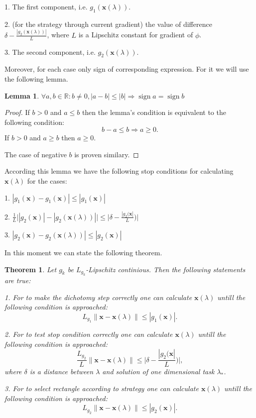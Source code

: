 \documentclass[12pt]{article}
\newtheorem{theorem}{Theorem}[section]
\newtheorem{lemma}{Lemma}[section]
\DeclareMathOperator{\sign}{sign}
\begin{document}
1. The first component, i.e. $g_1(\textbf{x}(\lambda))$.

2. (for the strategy through current gradient) the value of difference $\delta-\frac{|g_2(\textbf{x}(\lambda))|}{L}$, where $L$ is a Lipschitz constant for gradient of $\phi$.

3. The second component, i.e. $g_2(\textbf{x}(\lambda))$.

Moreover, for each case only sign of corresponding expression. For it we will use the following lemma.
\begin{lemma}
$\forall a,b\in\mathbb{R}:b\neq 0, |a-b|\leq |b| \Rightarrow \sign a = \sign b$
\end{lemma}
\begin{proof}
If $b>0$ and $a\leq b$ then the lemma's condition is equivalent to the following condition:
$$b-a\leq b\Rightarrow a\geq 0.$$
If $b>0$ and $a \geq b$ then $a\geq 0$.

The case of negative $b$ is proven similary.
\end{proof}

According this lemma we have the following stop conditions for calculating $\textbf{x}(\lambda)$ for the cases:

1. $|g_1(\textbf{x})-g_1(\textbf{x})|\leq |g_1(\textbf{x})|$

2. $\frac{1}{L}\Big||g_2(\textbf{x})|-|g_2(\textbf{x}(\lambda))|\Big|\leq \Big|\delta-\frac{|g_2(\textbf{x}|}{L})\Big|$

3. $|g_2(\textbf{x})-g_2(\textbf{x}(\lambda))|\leq |g_2(\textbf{x})|$

In this moment we can state the following theorem.

\begin{theorem}\label{x_lambda}
Let $g_k$ be $L_{g_k}$-Lipschitz continious. Then the following statements are true:

1. For to make the dichotomy step correctly one can calculate $\textbf{x}(\lambda)$ untill the following condition is approached:
$$L_{g_1}\|\textbf{x}-\textbf{x}(\lambda)\|\leq |g_1(\textbf{x})|.$$

2. For to test stop condition correctly one can calculate $\textbf{x}(\lambda)$ untill the following condition is approached:
$$\frac{L_{g_2}}{L}\|\textbf{x}-\textbf{x}(\lambda)\|\leq\Big|\delta-\frac{|g_2(\textbf{x}|}{L})\Big|,$$
where $\delta$ is a distance between $\lambda$ and solution of one dimensional task $\lambda_*$.

3. For to select rectangle according to strategy one can calculate $\textbf{x}(\lambda)$ untill the following condition is approached:
$$L_{g_2}\|\textbf{x}-\textbf{x}(\lambda)\|\leq |g_2(\textbf{x})|.$$
\end{theorem}
\end{document}
